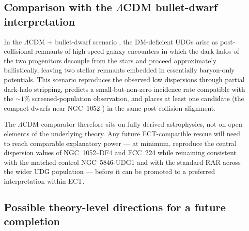 \subsection{Comparison with the $\Lambda$CDM bullet-dwarf interpretation}
\label{app:udg:lcdm}

In the $\Lambda$CDM + bullet-dwarf scenario
\cite{Ogiya2018DF2tidal,Moreno2022DMfree,vanDokkum2022bullet},
the DM-deficient UDGs arise as post-collisional remnants of
high-speed galaxy encounters in which the dark halos of the two
progenitors decouple from the stars and proceed approximately
ballistically, leaving two stellar remnants embedded in
essentially baryon-only potentials.  This scenario reproduces the
observed low dispersions through partial dark-halo stripping,
predicts a small-but-non-zero incidence rate compatible with the
$\sim 1\%$ screened-population observation, and places at least one
candidate (the compact dwarfs near NGC~1052 \cite{vanDokkum2022bullet})
in the same post-collision alignment.

The $\Lambda$CDM comparator therefore sits on fully derived
astrophysics, not on open elements of the underlying theory.  Any
future ECT-compatible rescue will need to reach comparable
explanatory power --- at minimum, reproduce the central dispersion
values of NGC~1052--DF4 and FCC~224 while remaining consistent
with the matched control NGC~5846-UDG1 and with the standard RAR
across the wider UDG population --- before it can be promoted to a
preferred interpretation within ECT.

\subsection{Possible theory-level directions for a future completion}
\label{app:udg:directions}

